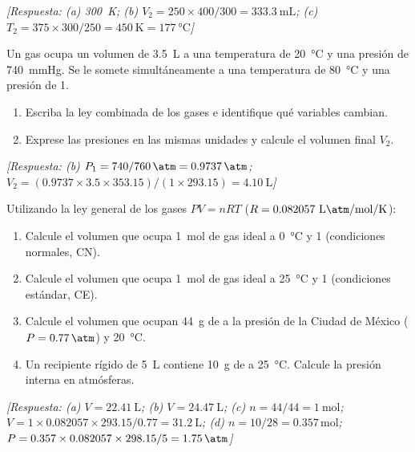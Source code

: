 \begin{bloque_ejercicios}
\begin{ejercicios}
\textit{[Respuesta:
(a) \SI{300}{\kelvin};
(b) $V_2 = 250\times400/300 = \SI{333.3}{\milli\liter}$;
(c) $T_2 = 375\times300/250 = \SI{450}{\kelvin} = \SI{177}{\celsius}$]}

\item Un gas ocupa un volumen de \SI{3.5}{\liter} a una temperatura de
\SI{20}{\celsius} y una presi\'on de \SI{740}{\mmHg}. Se le somete
simult\'aneamente a una temperatura de \SI{80}{\celsius} y una presi\'on
de \SI{1}{\atm}.

\begin{enumerate}[label=\alph*)]
    \item Escriba la ley combinada de los gases e identifique qu\'e
          variables cambian.
    \item Exprese las presiones en las mismas unidades y calcule
          el volumen final $V_2$.
\end{enumerate}

\textit{[Respuesta:
(b) $P_1 = 740/760\,\si{\atm} = 0.9737\,\si{\atm}$;
$V_2 = (0.9737\times3.5\times353.15)/(1\times293.15)
= \SI{4.10}{\liter}$]}

\item Utilizando la ley general de los gases $PV = nRT$
($R = 0.082057\ \si{\liter\atm\per\mole\per\kelvin}$):

\begin{enumerate}[label=\alph*)]
    \item Calcule el volumen que ocupa \SI{1}{\mole} de gas ideal
          a \SI{0}{\celsius} y \SI{1}{\atm} (condiciones normales, CN).
    \item Calcule el volumen que ocupa \SI{1}{\mole} de gas ideal
          a \SI{25}{\celsius} y \SI{1}{\atm} (condiciones est\'andar, CE).
    \item Calcule el volumen que ocupan \SI{44}{\gram} de 
          a la presi\'on de la Ciudad de M\'exico ($P = \SI{0.77}{\atm}$)
          y \SI{20}{\celsius}.
    \item Un recipiente r\'igido de \SI{5}{\liter} contiene
          \SI{10}{\gram} de  a \SI{25}{\celsius}.
          Calcule la presi\'on interna en atm\'osferas.
\end{enumerate}

\textit{[Respuesta:
(a) $V = \SI{22.41}{\liter}$;
(b) $V = \SI{24.47}{\liter}$;
(c) $n = 44/44 = \SI{1}{\mole}$;
    $V = 1\times0.082057\times293.15/0.77 = \SI{31.2}{\liter}$;
(d) $n = 10/28 = 0.357\,\si{\mole}$;
    $P = 0.357\times0.082057\times298.15/5 = \SI{1.75}{\atm}$]}


\end{ejercicios}
\end{bloque_ejercicios}
